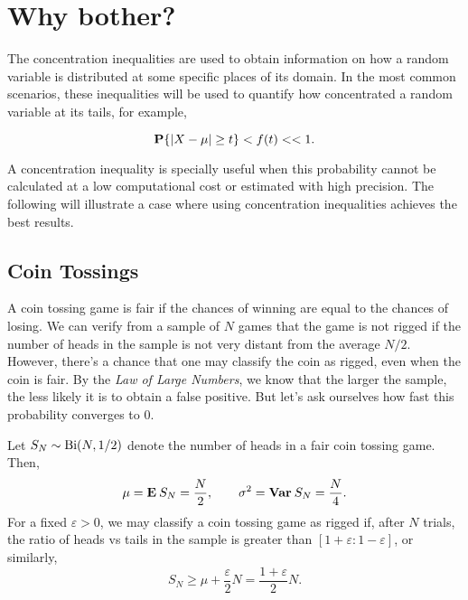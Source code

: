   


\vspace*{2em}

\section{Why bother?}

The concentration inequalities are used to obtain information on how a random variable is distributed at some specific places of its domain. In the most common scenarios, these inequalities will be used to quantify how concentrated a random variable at its tails, for example,

\[ \P\{|X-\mu| \geq t\} < f(t) << 1. \]

A concentration inequality is specially useful when this probability cannot be calculated at a low computational cost or estimated with high precision. The following  will illustrate a case where using concentration inequalities achieves the best results.

\subsection{Coin Tossings}

A coin tossing game is fair if the chances of winning are equal to the chances of losing. We can verify from a sample of $N$ games that the game is not rigged if the number of heads in the sample is not very distant from the average $N/2$. However, there's a chance that one may classify the coin as rigged, even when the coin is fair. By the \textit{Law of Large Numbers}, we know that the larger the sample, the less likely it is to obtain a false positive. But let's ask ourselves how fast this probability converges to 0.

\vspace*{1em}

Let $S_N \sim \Bi(N,1/2)$ denote the number of heads in a fair coin tossing game. Then,
\[ \mu = \E S_N = \frac{N}{2}, \hspace*{2em} \sigma^2 = \Var S_N = \frac{N}{4}. \] 
For a fixed $\varepsilon > 0$, we may classify a coin tossing game as rigged if, after $N$ trials, the ratio of heads vs tails in the sample is greater than $[1+\varepsilon:1-\varepsilon]$, or similarly,
\[ S_N \geq \mu +  \frac{\varepsilon}{2} N = \frac{1+\varepsilon}{2} N. \]

